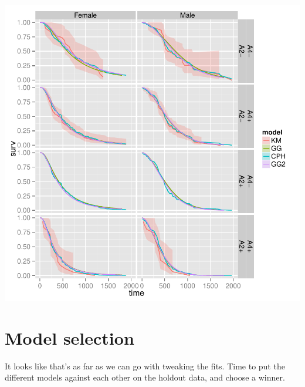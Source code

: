 \documentclass{article}\usepackage[]{graphicx}\usepackage[]{color}
\makeatletter
\def\maxwidth{ %
  \ifdim\Gin@nat@width>\linewidth
    \linewidth
  \else
    \Gin@nat@width
  \fi
}
\newenvironment{kframe}{%
 \def\at@end@of@kframe{}%
 \ifinner\ifhmode%
  \def\at@end@of@kframe{\end{minipage}}%
  \begin{minipage}{\columnwidth}%
 \fi\fi%
 \def\FrameCommand##1{\hskip\@totalleftmargin \hskip-\fboxsep
 \colorbox{shadecolor}{##1}\hskip-\fboxsep
     \hskip-\linewidth \hskip-\@totalleftmargin \hskip\columnwidth}%
 \MakeFramed {\advance\hsize-\width
   \@totalleftmargin\z@ \linewidth\hsize
   \@setminipage}}%
 {\par\unskip\endMakeFramed%
 \at@end@of@kframe}
\newenvironment{knitrout}{}{} %
\makeatother
\begin{document}
\begin{knitrout}
\begin{kframe}
{\ttfamily\noindent\color{warningcolor}{\#\# Warning: Removed 2 rows containing missing values (geom\_path).}}\end{kframe}

{\centering \includegraphics[width=\maxwidth]{figure/final-fit-assessment-3-2} 

}



\end{knitrout}

\section{Model selection}
It looks like that's as far as we can go with tweaking the fits.  Time to put the different models against each other on the holdout data, and choose a winner.
\end{document}
